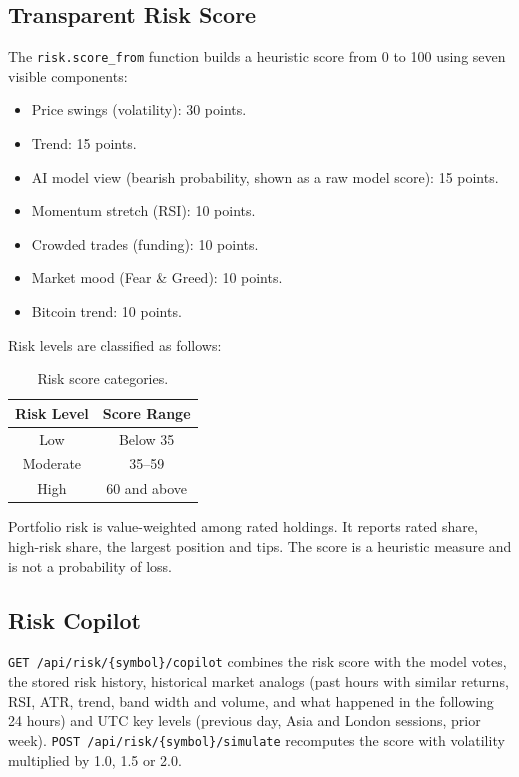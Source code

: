 \subsection{Transparent Risk Score}
The \texttt{risk.score\_from} function builds a heuristic score from 0 to 100 using seven visible components:
\begin{itemize}
\item Price swings (volatility): 30 points.
\item Trend: 15 points.
\item AI model view (bearish probability, shown as a raw model score): 15 points.
\item Momentum stretch (RSI): 10 points.
\item Crowded trades (funding): 10 points.
\item Market mood (Fear \& Greed): 10 points.
\item Bitcoin trend: 10 points.
\end{itemize}
Risk levels are classified as follows:
\begin{table}[H]\centering
\renewcommand{\arraystretch}{1.3}
\begin{tabular}{|c|c|}\hline
\textbf{Risk Level} & \textbf{Score Range}\\\hline
Low & Below 35\\\hline
Moderate & 35--59\\\hline
High & 60 and above\\\hline
\end{tabular}
\caption{Risk score categories.}\label{tab:risklevels}
\end{table}
Portfolio risk is value-weighted among rated holdings. It reports rated share, high-risk share, the largest position and tips. The score is a heuristic measure and is not a probability of loss.

\subsection{Risk Copilot}
\texttt{GET /api/risk/\{symbol\}/copilot} combines the risk score with the model votes, the stored risk history, historical market analogs (past hours with similar returns, RSI, ATR, trend, band width and volume, and what happened in the following 24 hours) and UTC key levels (previous day, Asia and London sessions, prior week). \texttt{POST /api/risk/\{symbol\}/simulate} recomputes the score with volatility multiplied by 1.0, 1.5 or 2.0.

